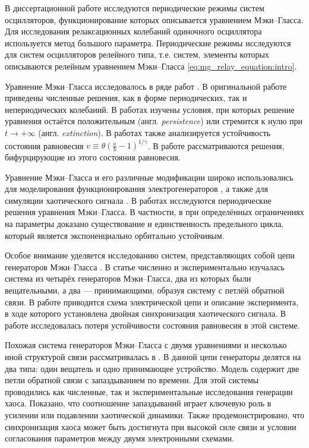 В диссертационной работе исследуются периодические режимы систем осцилляторов, функционирование которых описывается уравнением Мэки--Гласса. Для исследования релаксационных колебаний одиночного осциллятора используется метод большого параметра. Периодические режимы исследуются для систем осцилляторов релейного типа, т.е. систем, элементы которых описываются релейным уравнением Мэки--Гласса \eqref{eq:mg_relay_equation:intro}.

Уравнение Мэки--Гласса исследовалось в ряде работ \cite{Junges2012, Berezansky2006, Su2011, Liz2002, Wu2007, Kubyshkin2016}. В оригинальной работе \cite{Mackey1977} приведены численные решения, как в форме периодических, так и непериодических колебаний. В работах \cite{Berezansky2006, Liz2002} изучены условия, при которых решение уравнения остаётся положительным (англ. \emph{persistence}) или стремится к нулю при $t \to +\infty$ (англ. \emph{extinction}). В работах \cite{Berezansky2006, Kubyshkin2016} также анализируется устойчивость состояния равновесия $v \equiv \theta \left(\frac{a}{b} - 1\right)^{1/\gamma}$. В работе \cite{Kubyshkin2016} рассматриваются решения, бифурцирующие из этого состояния равновесия.

Уравнение Мэки--Гласса и его различные модификации широко использовались для моделирования функционирования электрогенераторов \cite{Tateno2012, Namajunas1995, Glyzin2018, Glyzin2018a}, а также для симуляции хаотического сигнала \cite{Grassberger1983, Amil2015, Amil2015a, Shahverdiev2006}. В работах \cite{Bartha2021, Krisztin2020} исследуются периодические решения уравнения Мэки--Гласса. В частности, в \cite{Bartha2021} при определённых ограничениях на параметры доказано существование и единственность предельного цикла, который является экспоненциально орбитально устойчивым.

Особое внимание уделяется исследованию систем, представляющих собой цепи генераторов Мэки--Гласса \cite{Preobrazhenskaia2021, Tateno2012, Sano2007, Wan2009}. В статье \cite{Sano2007} численно и экспериментально изучалась система из четырёх генераторов Мэки--Гласса, два из которых были вещательными, а два --- принимающими, образуя систему с петлёй обратной связи. В работе приводится схема электрической цепи и описание эксперимента, в ходе которого установлена двойная синхронизация хаотического сигнала. В работе \cite{Wan2009} исследовалась потеря устойчивости состояния равновесия в этой системе.

Похожая система генераторов Мэки--Гласса с двумя уравнениями и несколько иной структурой связи рассматривалась в \cite{Tateno2012}. В данной цепи генераторы делятся на два типа: один вещатель и одно принимающее устройство. Модель содержит две петли обратной связи с запаздыванием по времени. Для этой системы проводились как численные, так и экспериментальные исследования генерации хаоса. Показано, что соотношение запаздываний играет ключевую роль в усилении или подавлении хаотической динамики. Также продемонстрировано, что синхронизация хаоса может быть достигнута при высокой силе связи и условии согласования параметров между двумя электронными схемами.

